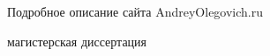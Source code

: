 \begin{titlepage}
    \begin{center}                                                        
    \Large Подробное описание сайта \linebreak                                  
    AndreyOlegovich.ru                                                                  
    \end{center}                                                          
                                                                                        
    \vspace{5em}                                                          
                                                                                        
    \begin{center}                                                        
     магистерская диссертация                                                           
     \end{center}                                                         
    \vspace{6em}                                                          
                                                                                        
                                                                                        

\end{titlepage}

